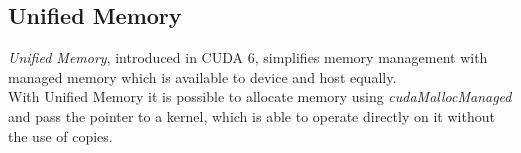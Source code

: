 \subsection{Unified Memory}
\label{sec:unified_memory}
\emph{Unified Memory}, introduced in CUDA 6, simplifies memory management with managed memory which is available to device and host equally.\\
With Unified Memory it is possible to allocate memory using \emph{cudaMallocManaged} and pass the pointer to a kernel, which is able to operate directly on it without the use of copies.
